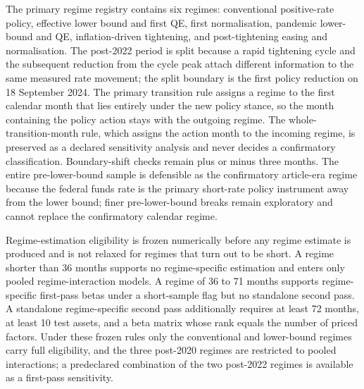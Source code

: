 \documentclass[11pt]{article}
\begin{document}
The primary regime registry contains six regimes: conventional positive-rate
policy, effective lower bound and first QE, first normalisation, pandemic
lower-bound and QE, inflation-driven tightening, and post-tightening easing and
normalisation. The post-2022 period is split because a rapid tightening cycle %
and the subsequent reduction from the cycle peak attach different information to
the same measured rate movement; the split boundary is the first policy
reduction on 18 September 2024. %
The primary transition rule assigns a regime to the first calendar month that
lies entirely under the new policy stance, so the month containing the policy
action stays with the outgoing regime. The whole-transition-month rule, which
assigns the action month to the incoming regime, is preserved as a declared
sensitivity analysis and never decides a confirmatory classification. %
Boundary-shift checks remain plus or minus three months. The
entire pre-lower-bound sample is defensible as the confirmatory article-era
regime because the federal funds rate is the primary short-rate policy
instrument away from the lower bound; finer pre-lower-bound breaks remain
exploratory and cannot replace the confirmatory calendar regime. %

Regime-estimation eligibility is frozen numerically before any regime estimate
is produced and is not relaxed for regimes that turn out to be short. A regime
shorter than 36 months supports no regime-specific estimation and enters only %
pooled regime-interaction models. A regime of 36 to 71 months supports %
regime-specific first-pass betas under a short-sample flag but no standalone
second pass. A standalone regime-specific second pass additionally requires at
least 72 months, at least 10 test assets, and a beta matrix whose rank equals %
the number of priced factors. Under these frozen rules only the conventional
and lower-bound regimes carry full eligibility, and the three post-2020 regimes %
are restricted to pooled interactions; a predeclared combination of the two
post-2022 regimes is available as a first-pass sensitivity. %
\end{document}
